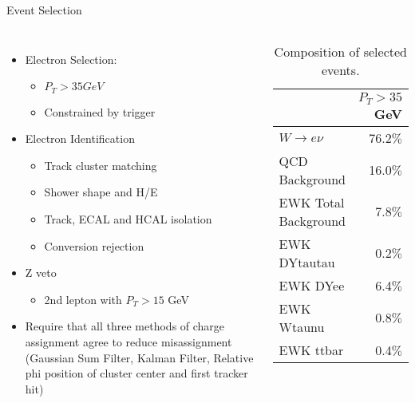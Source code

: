 \documentclass[t, 8pt]{beamer}
\begin{document}
\begin{frame}{Event Selection}
  \begin{columns}[c]
  \begin{itemize}
    \item Electron Selection:
    \begin{itemize}
      \item $P_T > 35 GeV$
      \item Constrained by trigger
    \end{itemize}
    \item Electron Identification
    \begin{itemize}
      \item Track cluster matching
      \item Shower shape and H/E
      \item Track, ECAL and HCAL isolation
      \item Conversion rejection
    \end{itemize}
    \item Z veto
    \begin{itemize}
      \item 2nd lepton with $P_T > 15$ GeV
    \end{itemize}
    \item Require that all three methods of charge assignment agree to reduce
    misassignment (Gaussian Sum Filter, Kalman Filter, Relative phi position of
    cluster center and first tracker hit)
  \end{itemize}
    \tiny{
  \begin{center}

    \begin{table}[htbp]
    \begin{tabular}{|l|r|}
    \hline
    & $P_{T}>35$ GeV \\ \hline
    $W\to e\nu$  & 76.2$\%$\\\hline
    QCD Background       & 16.0$\%$\\\hline
    EWK Total Background & 7.8$\%$ \\
    EWK DYtautau         & 0.2$\%$  \\
    EWK DYee             & 6.4$\%$  \\
    EWK Wtaunu           & 0.8$\%$ \\
    EWK ttbar            & 0.4$\%$ \\\hline
    \end{tabular}
    \caption{\label{tab:composition} Composition of selected events.}%
    \end{table}
  \end{center}
  }

  \end{columns}
\end{frame}
\end{document}
